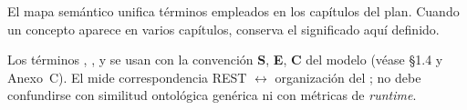 El mapa semántico unifica términos empleados en los capítulos del plan. Cuando un concepto aparece
en varios capítulos, conserva el significado aquí definido.



Los términos \SemanticScore{}, \StructuralScore{}, \CoverageScore{} y \AlignmentScore{} se usan
con la convención \textbf{S}, \textbf{E}, \textbf{C} del modelo (véase §1.4 y Anexo~C). El
\StructuralScore{} mide correspondencia REST $\leftrightarrow$ organización del \ServiceDomain{};
no debe confundirse con similitud ontológica genérica ni con métricas de \textit{runtime}.
